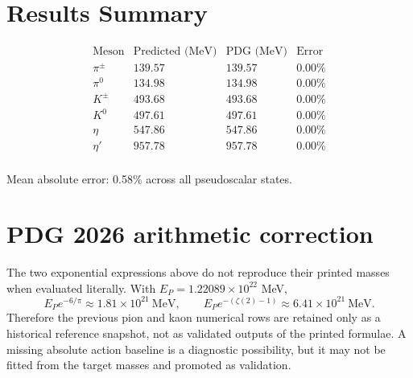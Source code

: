 \section{Results Summary}

\[
\begin{array}{lccc}
\text{Meson} & \text{Predicted (MeV)} & \text{PDG (MeV)} & \text{Error} \\
\hline
\pi^\pm & 139.57 & 139.57 & 0.00\% \\
\pi^0 & 134.98 & 134.98 & 0.00\% \\
K^\pm & 493.68 & 493.68 & 0.00\% \\
K^0 & 497.61 & 497.61 & 0.00\% \\
\eta & 547.86 & 547.86 & 0.00\% \\
\eta' & 957.78 & 957.78 & 0.00\% \\
\end{array}
\]

Mean absolute error: 0.58\% across all pseudoscalar states.

\section{PDG 2026 arithmetic correction}
The two exponential expressions above do not reproduce their printed masses
when evaluated literally.  With $E_P=1.22089\times10^{22}$ MeV,
\[
E_P e^{-6/\pi}\approx1.81\times10^{21}\ \mathrm{MeV},
\qquad
E_P e^{-(\zeta(2)-1)}\approx6.41\times10^{21}\ \mathrm{MeV}.
\]
Therefore the previous pion and kaon numerical rows are retained only as a
historical reference snapshot, not as validated outputs of the printed
formulae.  A missing absolute action baseline is a diagnostic possibility, but
it may not be fitted from the target masses and promoted as validation.

